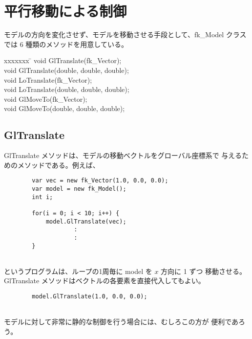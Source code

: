 \section{平行移動による制御}
モデルの方向を変化させず、モデルを移動させる手段として、fk\_Model クラス
では 6 種類のメソッドを用意している。
\begin{bf}
\begin{tabbing}
xxxxxxx \= \kill
\> void GlTranslate(fk\_Vector); \\
\> void GlTranslate(double, double, double); \\
\> void LoTranslate(fk\_Vector); \\
\> void LoTranslate(double, double, double); \\
\> void GlMoveTo(fk\_Vector); \\
\> void GlMoveTo(double, double, double); \\
\end{tabbing}
\end{bf}
\subsection{GlTranslate}
GlTranslate メソッドは、モデルの移動ベクトルをグローバル座標系で
与えるためのメソッドである。例えば、
\\
\begin{breakbox}
\begin{verbatim}
        var vec = new fk_Vector(1.0, 0.0, 0.0);
        var model = new fk_Model();
        int i;

        for(i = 0; i < 10; i++) {
            model.GlTranslate(vec);
                    :
                    :
        }
\end{verbatim}
\end{breakbox}
~ \\
というプログラムは、ループの1周毎に model を \(x\) 方向に 1 ずつ
移動させる。GlTranslate メソッドはベクトルの各要素を直接代入してもよい。
\\
\begin{screen}
\begin{verbatim}
        model.GlTranslate(1.0, 0.0, 0.0);
\end{verbatim}
\end{screen}
~ \\
モデルに対して非常に静的な制御を行う場合には、むしろこの方が
便利であろう。

